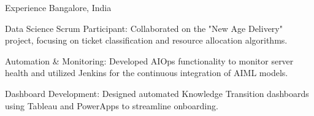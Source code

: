 
\vspace{-3mm}


\vspace{-1mm}
\begin{cventries}

\cventry
{{}}  %
{{}{Experience}} %
{{Bangalore, India}} %
{} %
{
    \begin{cvitems} %
    \item {Data Science Scrum Participant: Collaborated on the "New Age Delivery" project, focusing on ticket classification and resource allocation algorithms.}
    \item {Automation \& Monitoring: Developed AIOps functionality to monitor server health and utilized Jenkins for the continuous integration of AIML models.}
    \item {Dashboard Development: Designed automated Knowledge Transition dashboards using Tableau and PowerApps to streamline onboarding.}
\end{cvitems}
}




\end{cventries}












